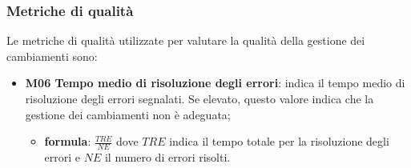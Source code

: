 \subsubsection{Metriche di qualità}
Le metriche di qualità utilizzate per valutare la qualità della gestione dei cambiamenti sono:
\begin{itemize}
	\item \textbf{M06 Tempo medio di risoluzione degli errori}: indica il tempo medio di risoluzione degli errori segnalati. Se elevato, questo valore indica che la gestione dei cambiamenti non è adeguata;
	\begin{itemize}
		\item[] \textbf{formula}: $\frac{TRE}{NE}$ dove $TRE$ indica il tempo totale per la risoluzione degli errori e $NE$ il numero di errori risolti.
	\end{itemize} 
\end{itemize}		
